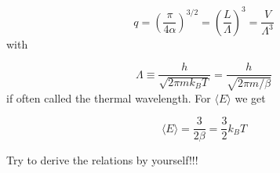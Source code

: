 \documentclass[10pt]{article}
\begin{document}
\begin{equation} %
   q=\left( \frac{\pi}{4\alpha}\right)^{3/2}=\left(  \frac{L}{\Lambda} \right)^3=\frac{V}{\Lambda^3}
   \label{equation:1.5} 
\end{equation}
%
with

\begin{equation} %
   \Lambda \equiv \frac{h}{\sqrt{2\pi mk_BT}}=\frac{h}{\sqrt{2\pi m/\beta}}
   \label{equation:1.6} 
\end{equation}
%
if often called the thermal wavelength. For $\langle E\rangle $ we get 

\begin{equation} %
   \langle E\rangle=\frac{3}{2\beta}=\frac{3}{2}k_BT
   \label{equation:1.7} 
\end{equation}

Try to derive the relations by yourself!!!



\end{document}
